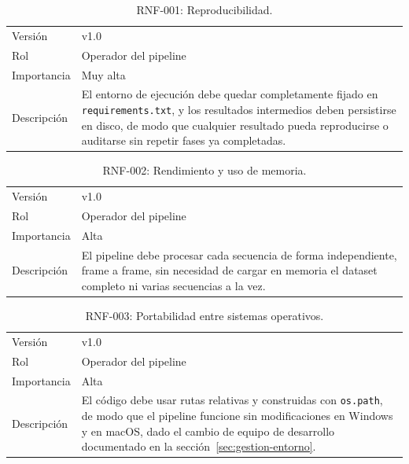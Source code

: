 \begin{table}[htp]
\centering
\caption{RNF-001: Reproducibilidad.}
\label{tab:rnf-001}
\renewcommand{\arraystretch}{1.2}
\begin{tabular}{|p{3.1cm}|p{9.2cm}|}
\hline
\rowcolor{gray!25}
\multicolumn{2}{|l|}{\textbf{RNF-001 -- Reproducibilidad}} \\
\hline
Versión & v1.0 \\
\hline
Rol & Operador del pipeline \\
\hline
Importancia & Muy alta \\
\hline
Descripción & El entorno de ejecución debe quedar completamente fijado en
  \texttt{requirements.txt}, y los resultados intermedios deben persistirse
  en disco, de modo que cualquier resultado pueda reproducirse o
  auditarse sin repetir fases ya completadas. \\
\hline
\end{tabular}
\end{table}

\begin{table}[htp]
\centering
\caption{RNF-002: Rendimiento y uso de memoria.}
\label{tab:rnf-002}
\renewcommand{\arraystretch}{1.2}
\begin{tabular}{|p{3.1cm}|p{9.2cm}|}
\hline
\rowcolor{gray!25}
\multicolumn{2}{|l|}{\textbf{RNF-002 -- Rendimiento y uso de memoria}} \\
\hline
Versión & v1.0 \\
\hline
Rol & Operador del pipeline \\
\hline
Importancia & Alta \\
\hline
Descripción & El pipeline debe procesar cada secuencia de forma
  independiente, frame a frame, sin necesidad de cargar en memoria el
  dataset completo ni varias secuencias a la vez. \\
\hline
\end{tabular}
\end{table}

\begin{table}[htp]
\centering
\caption{RNF-003: Portabilidad entre sistemas operativos.}
\label{tab:rnf-003}
\renewcommand{\arraystretch}{1.2}
\begin{tabular}{|p{3.1cm}|p{9.2cm}|}
\hline
\rowcolor{gray!25}
\multicolumn{2}{|l|}{\textbf{RNF-003 -- Portabilidad entre sistemas operativos}} \\
\hline
Versión & v1.0 \\
\hline
Rol & Operador del pipeline \\
\hline
Importancia & Alta \\
\hline
Descripción & El código debe usar rutas relativas y construidas con
  \texttt{os.path}, de modo que el pipeline funcione sin modificaciones en
  Windows y en macOS, dado el cambio de equipo de desarrollo documentado en
  la sección~\ref{sec:gestion-entorno}. \\
\hline
\end{tabular}
\end{table}

